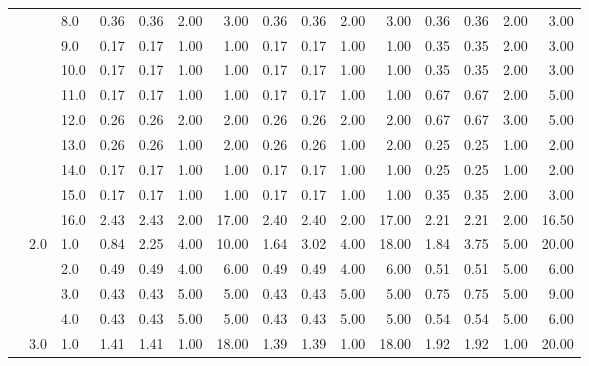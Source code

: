 \begin{tabular}{lllrrrrrrrrrrrr}
       &     & 8.0  &       0.36 &      0.36 & 2.00 &   3.00 &       0.36 &      0.36 &  2.00 &   3.00 &       0.36 &      0.36 &  2.00 &   3.00 \\
       &     & 9.0  &       0.17 &      0.17 & 1.00 &   1.00 &       0.17 &      0.17 &  1.00 &   1.00 &       0.35 &      0.35 &  2.00 &   3.00 \\
       &     & 10.0 &       0.17 &      0.17 & 1.00 &   1.00 &       0.17 &      0.17 &  1.00 &   1.00 &       0.35 &      0.35 &  2.00 &   3.00 \\
       &     & 11.0 &       0.17 &      0.17 & 1.00 &   1.00 &       0.17 &      0.17 &  1.00 &   1.00 &       0.67 &      0.67 &  2.00 &   5.00 \\
       &     & 12.0 &       0.26 &      0.26 & 2.00 &   2.00 &       0.26 &      0.26 &  2.00 &   2.00 &       0.67 &      0.67 &  3.00 &   5.00 \\
       &     & 13.0 &       0.26 &      0.26 & 1.00 &   2.00 &       0.26 &      0.26 &  1.00 &   2.00 &       0.25 &      0.25 &  1.00 &   2.00 \\
       &     & 14.0 &       0.17 &      0.17 & 1.00 &   1.00 &       0.17 &      0.17 &  1.00 &   1.00 &       0.25 &      0.25 &  1.00 &   2.00 \\
       &     & 15.0 &       0.17 &      0.17 & 1.00 &   1.00 &       0.17 &      0.17 &  1.00 &   1.00 &       0.35 &      0.35 &  2.00 &   3.00 \\
       &     & 16.0 &       2.43 &      2.43 & 2.00 &  17.00 &       2.40 &      2.40 &  2.00 &  17.00 &       2.21 &      2.21 &  2.00 &  16.50 \\
       & 2.0 & 1.0  &       0.84 &      2.25 & 4.00 &  10.00 &       1.64 &      3.02 &  4.00 &  18.00 &       1.84 &      3.75 &  5.00 &  20.00 \\
       &     & 2.0  &       0.49 &      0.49 & 4.00 &   6.00 &       0.49 &      0.49 &  4.00 &   6.00 &       0.51 &      0.51 &  5.00 &   6.00 \\
       &     & 3.0  &       0.43 &      0.43 & 5.00 &   5.00 &       0.43 &      0.43 &  5.00 &   5.00 &       0.75 &      0.75 &  5.00 &   9.00 \\
       &     & 4.0  &       0.43 &      0.43 & 5.00 &   5.00 &       0.43 &      0.43 &  5.00 &   5.00 &       0.54 &      0.54 &  5.00 &   6.00 \\
       & 3.0 & 1.0  &       1.41 &      1.41 & 1.00 &  18.00 &       1.39 &      1.39 &  1.00 &  18.00 &       1.92 &      1.92 &  1.00 &  20.00 \\

\end{tabular}
